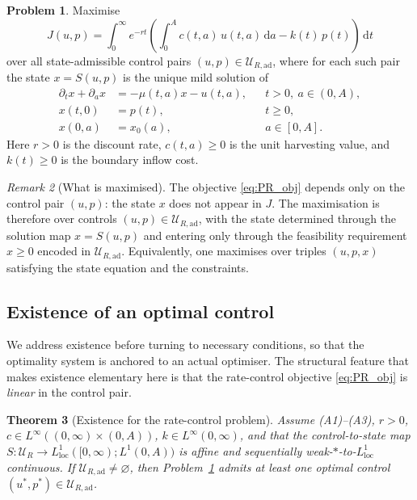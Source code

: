 \documentclass[pdflatex,sn-mathphys-num]{sn-jnl}
\newtheorem{theorem}{Theorem}[section]
\theoremstyle{definition}
\newtheorem{problem}[theorem]{Problem}
\theoremstyle{remark}
\newtheorem{remark}[theorem]{Remark}
\newcommand{\dd}{\,\mathrm{d}}
\begin{document}
\begin{problem}\label{prob:PR}
Maximise
\begin{equation}\label{eq:PR_obj}
J(u,p)=\int_0^\infty e^{-rt}
\left(\int_0^A c(t,a)\,u(t,a)\dd a-k(t)\,p(t)\right)\dd t
\end{equation}
over all state-admissible control pairs $(u,p)\in\mathcal{U}_{R,\mathrm{ad}}$,
where for each such pair the state $x=S(u,p)$ is the unique mild solution of
\begin{align}
\partial_t x+\partial_a x&=-\mu(t,a)x-u(t,a), && t>0,\ a\in(0,A),
\label{eq:PR_state}\\
x(t,0)&=p(t), && t\ge0, \label{eq:PR_bc}\\
x(0,a)&=x_0(a), && a\in[0,A]. \label{eq:PR_ic}
\end{align}
Here $r>0$ is the discount rate, $c(t,a)\ge0$ is the unit harvesting value,
and $k(t)\ge0$ is the boundary inflow cost.
\end{problem}

\begin{remark}[What is maximised]
The objective \eqref{eq:PR_obj} depends only on the control pair $(u,p)$:
the state $x$ does not appear in $J$. The maximisation is therefore over
controls $(u,p)\in\mathcal{U}_{R,\mathrm{ad}}$, with the state determined
through the solution map $x=S(u,p)$ and entering only through the
feasibility requirement $x\ge0$ encoded in $\mathcal{U}_{R,\mathrm{ad}}$.
Equivalently, one maximises over triples $(u,p,x)$ satisfying the state
equation and the constraints.
\end{remark}


\subsection{Existence of an optimal control}

We address existence before turning to necessary
conditions, so that the optimality system is anchored to an actual
optimiser. The structural feature that makes existence elementary here is
that the rate-control objective \eqref{eq:PR_obj} is \emph{linear} in the
control pair.

\begin{theorem}[Existence for the rate-control problem]
\label{thm:existence_PR}
Assume \textup{(A1)--(A3)}, $r>0$, $c\in L^\infty((0,\infty)\times(0,A))$,
$k\in L^\infty(0,\infty)$, and that the control-to-state map
$S:\mathcal{U}_R\to L^1_{\mathrm{loc}}([0,\infty);L^1(0,A))$ is affine and
sequentially weak-$\ast$-to-$L^1_{\mathrm{loc}}$ continuous. If
$\mathcal{U}_{R,\mathrm{ad}}\neq\varnothing$, then Problem~\ref{prob:PR}
admits at least one optimal control
$(u^\ast,p^\ast)\in\mathcal{U}_{R,\mathrm{ad}}$.
\end{theorem}
\end{document}
